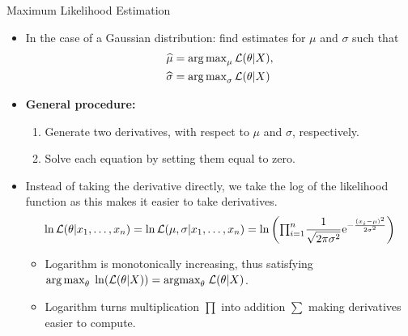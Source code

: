 \begin{frame}{Maximum Likelihood Estimation}
	\begin{itemize}
		\item In the case of a Gaussian distribution: find estimates for $\mu$ and $\sigma$ such that
		      \begin{align*}
			      \widehat{\mu}    & = \textstyle\operatorname*{arg\,max}_{\mu} \mathcal{L}(\theta|X),   \\
			      \widehat{\sigma} & = \textstyle\operatorname*{arg\,max}_{\sigma} \mathcal{L}(\theta|X)
		      \end{align*}
		\item \textbf{General procedure:}
		      \begin{enumerate}
			      \item Generate two derivatives, with respect to $\mu$ and $\sigma$, respectively.
			      \item Solve each equation by setting them equal to zero.
		      \end{enumerate}
		\item Instead of taking the derivative directly, we take the log of the likelihood function as this makes it easier to take derivatives.
		      \begin{equation*}
			      \ln{\mathcal{L}(\theta|x_1, \dots, x_n)}=\ln{\mathcal{L}(\mu, \sigma|x_1, \dots, x_n)}= \ln{\bigg({\textstyle\prod\nolimits_{i=1}^n} \frac{1}{\sqrt{2\pi \sigma^2}} {\rm e}^{-\frac{(x_i-\mu)^2}{2\sigma^2}}\bigg)}
		      \end{equation*}
		      \begin{itemize}
			      \item Logarithm is monotonically increasing, thus satisfying $\operatorname*{arg\,max}_{\theta} \; \ln(\mathcal{L}(\theta|X)) = \text{argmax}_{\theta} \; \mathcal{L}(\theta|X)$.
			      \item Logarithm turns multiplication $\prod$ into addition $\sum$ making derivatives easier to compute.
		      \end{itemize}
	\end{itemize}

\end{frame}

